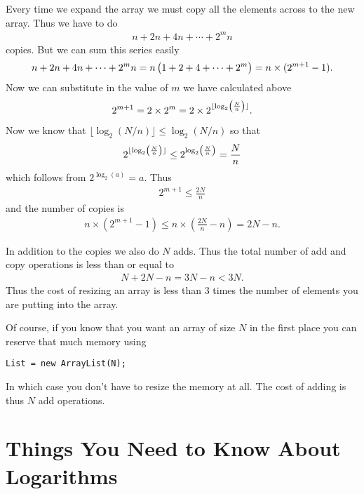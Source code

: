 \documentclass{article}
\begin{document}
Every time we expand the array we must copy all the elements across to
the new array.  Thus we have to do
\begin{align*}
  n + 2n + 4n + \cdots + 2^m n
\end{align*}
copies.  But we can sum this series easily
\begin{align*}
  n + 2n + 4n + \cdots + 2^m n = n\left( \strut 1+2+4+\cdots+ 2^m \right)
  = n\times (2^{m+1}-1).
\end{align*}
Now we can substitute in the value of $m$ we have calculated above
\begin{align*}
  2^{m+1} = 2 \times 2^m = 2 \times 2^{\lfloor \log_2\left(\strut
  \frac{N}{n} \right) \rfloor}.
\end{align*}
Now we know that $\lfloor \log_2(N/n) \rfloor\leq \log_2(N/n)$ so that
\begin{align*}
  2^{\lfloor \log_2\left(\strut \frac{N}{n} \right) \rfloor} \leq
  2^{\log_2\left(\strut \frac{N}{n} \right)} = \frac{N}{n}
\end{align*}
which follows from $2^{\log_2(a)}=a$.  Thus
\begin{align*}
  2^{m+1} \leq \frac{2N}{n}
\end{align*}
and the number of copies is
\begin{align*}
  n \times (2^{m+1}-1) \leq n\times \left(\frac{2N}{n} -n\right) = 2N-n.
\end{align*}

In addition to the copies we also do $N$ adds.  Thus the total number of
add and copy operations is less than or equal to
\begin{align*}
  N+2N-n= 3N-n < 3N.
\end{align*}
Thus the cost of resizing an array is less than 3 times the number of
elements you are putting into the array.

Of course, if you know that you want an array of size $N$ in the first
place you can reserve that much memory using
\begin{verbatim}
List = new ArrayList(N);
\end{verbatim}
In which case you don't have to resize the memory at all.  The cost of
adding is thus $N$ add operations.



\section*{Things You Need to Know About Logarithms}
\end{document}
